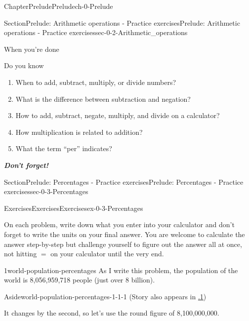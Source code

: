\documentclass[twoside,11pt,]{book}
\newcommand{\xreffont}{\relax}
\newcommand{\alert}[1]{\textbf{\textit{#1}}}
\numberwithin{equation}{section}
\begin{document}
\begin{chapterptx}{Chapter}{Prelude}{}{Prelude}{}{}{ch-0-Prelude}
\begin{sectionptx}{Section}{Prelude: Arithmetic operations - Practice exercises}{}{Prelude: Arithmetic operations - Practice exercises}{}{}{sec-0-2-Arithmetic_operations}
\begin{conclusion}{When you're done \textellipsis{}}
\begin{itemize}[label=\textbullet]
\end{itemize}
%
\end{conclusion}%
\begin{conclusion}{Do you know \textellipsis{}}%
%
\begin{enumerate}[label={\Alph*.}]
\item{}When to add, subtract, multiply, or divide numbers?%
\item{}What is the difference between subtraction and negation?%
\item{}How to add, subtract, negate, multiply, and divide on a calculator?%
\item{}How multiplication is related to addition?%
\item{}What the term ``per'' indicates?%
\end{enumerate}
%
\par
\alert{Don't forget!}%
\end{conclusion}%
\end{sectionptx}
%
%
\typeout{************************************************}
\typeout{************************************************}
%
\begin{sectionptx}{Section}{Prelude: Percentages - Practice exercises}{}{Prelude: Percentages - Practice exercises}{}{}{sec-0-3-Percentages}
%
%
\typeout{************************************************}
\typeout{************************************************}
%
\begin{exercises-subsection-numberless}{Exercises}{Exercises}{}{Exercises}{}{}{ex-0-3-Percentages}
\begin{introduction}{}%
On each problem, write down what you enter into your calculator and don't forget to write the units on your final answer. You are welcome to calculate the answer step-by-step but challenge yourself to figure out the answer all at once, not hitting \(=\) on your calculator until the very end.%
\end{introduction}%
\begin{divisionexercise}{1}{}{}{world-population-percentages}%
As I write this problem, the population of the world is 8,056,959,718 people (just over 8 billion). \begin{aside}{Aside}{}{world-population-percentages-1-1-1}%
(Story also appears in \hyperlink{world-population-percentages}{{\xreffont 0.3.1}})%
\end{aside}
 It changes by the second, so let's use the round figure of 8,100,000,000.%

\end{divisionexercise}
\end{exercises-subsection-numberless}
\end{sectionptx}
\end{chapterptx}
\end{document}
